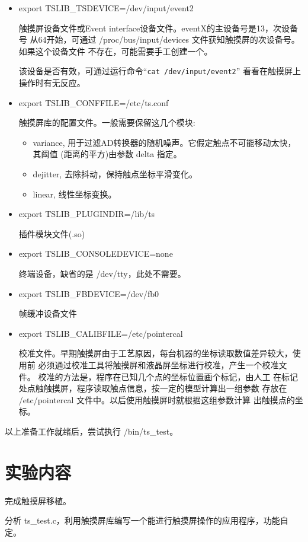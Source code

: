 \begin{itemize}
  \item export TSLIB\_TSDEVICE=/dev/input/event2

	触摸屏设备文件或Event interface设备文件。eventX的主设备号是13，次设备号
从64开始，可通过 /proc/bus/input/devices 文件获知触摸屏的次设备号。如果这个设备文件
        不存在，可能需要手工创建一个。

        该设备是否有效，可通过运行命令``\verb!cat /dev/input/event2!''
        看看在触摸屏上操作时有无反应。
  \item export TSLIB\_CONFFILE=/etc/ts.conf         

	触摸屏库的配置文件。一般需要保留这几个模块:
  \begin{itemize}
    \item variance, 用于过滤AD转换器的随机噪声。它假定触点不可能移动太快，
	其阈值 (距离的平方)由参数 delta 指定。
    \item dejitter, 去除抖动，保持触点坐标平滑变化。
    \item linear, 线性坐标变换。
  \end{itemize}
  \item export TSLIB\_PLUGINDIR=/lib/ts

	插件模块文件(.so)
  \item export TSLIB\_CONSOLEDEVICE=none

	终端设备，缺省的是 /dev/tty，此处不需要。
  \item export TSLIB\_FBDEVICE=/dev/fb0

	帧缓冲设备文件
  \item export TSLIB\_CALIBFILE=/etc/pointercal

校准文件。早期触摸屏由于工艺原因，每台机器的坐标读取数值差异较大，使用前
必须通过校准工具将触摸屏和液晶屏坐标进行校准，产生一个校准文件。
校准的方法是，程序在已知几个点的坐标位置画个标记，由人工
        在标记处点触触摸屏，程序读取触点信息，按一定的模型计算出一组参数
        存放在 /etc/pointercal 文件中。以后使用触摸屏时就根据这组参数计算
        出触摸点的坐标。
\end{itemize}

以上准备工作就绪后，尝试执行 /bin/ts\_test。

\section{实验内容}
完成触摸屏移植。

分析 ts\_test.c，利用触摸屏库编写一个能进行触摸屏操作的应用程序，功能自定。
